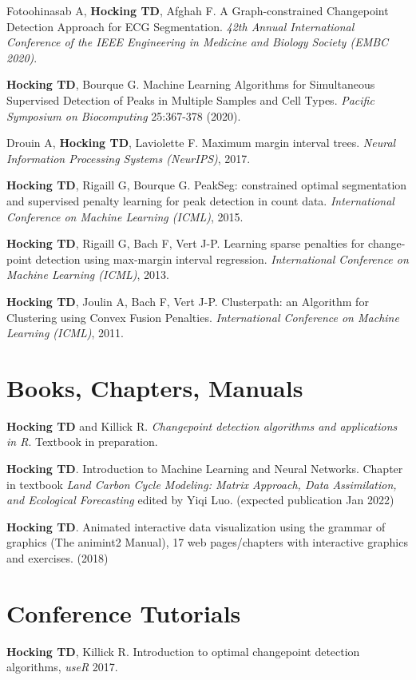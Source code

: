 \documentclass[margin,line]{res}
\begin{document}
\begin{resume}
Fotoohinasab A, {\bf Hocking TD}, Afghah F. A Graph-constrained
Changepoint Detection Approach for ECG Segmentation. 
{\it 42th Annual International Conference of the IEEE Engineering in
  Medicine and Biology Society (EMBC 2020)}.

{\bf Hocking TD}, Bourque G. Machine Learning Algorithms for
Simultaneous Supervised Detection of Peaks in Multiple Samples and
Cell Types. {\it Pacific Symposium on Biocomputing} 25:367-378 (2020).

Drouin A, {\bf Hocking TD}, Laviolette F. Maximum margin interval
trees. {\it Neural Information Processing Systems (NeurIPS)}, 2017.

{\bf Hocking TD}, Rigaill G, Bourque G. PeakSeg: constrained optimal
segmentation and supervised penalty learning for peak detection in
count data. {\it International Conference on Machine Learning (ICML)},
2015.

{\bf Hocking TD}, Rigaill G, Bach F, Vert J-P. Learning sparse
penalties for change-point detection using max-margin interval
regression. {\it International Conference on Machine Learning (ICML)}, 2013.

{\bf Hocking TD}, Joulin A, Bach F, Vert J-P. Clusterpath: an
Algorithm for Clustering using Convex Fusion Penalties. {\it International Conference on Machine Learning (ICML)}, 2011.

\section{\sc Books, Chapters, Manuals}

{\bf Hocking TD} and Killick R. {\it Changepoint detection algorithms
  and applications in R}. Textbook in preparation.

{\bf Hocking TD}. Introduction to Machine Learning and Neural
Networks. Chapter in textbook {\it Land Carbon Cycle Modeling: Matrix
  Approach, Data Assimilation, and Ecological Forecasting} edited by
Yiqi Luo. (expected publication Jan 2022)

{\bf Hocking TD}. Animated interactive data visualization using the
grammar of graphics (The animint2 Manual), 17 web pages/chapters with
interactive graphics and exercises. (2018)

\section{\sc Conference Tutorials}

{\bf Hocking TD}, Killick R. Introduction to optimal changepoint
detection algorithms, {\it useR} 2017.


\end{resume}
\end{document}
